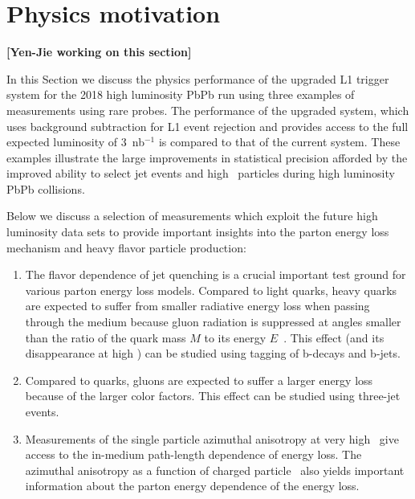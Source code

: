 \section{Physics motivation\label{sec:physHI}}
\label{sec:physics}

{\bf [Yen-Jie working on this section]}

In this Section we discuss the physics performance of the upgraded L1 trigger system for the 2018 high luminosity PbPb run
using three examples of measurements using rare probes. 
The performance of the upgraded system, which uses background subtraction for L1 event rejection and provides 
access to the full expected luminosity of 3~nb$^{-1}$ is compared to that of the current system. 
These examples illustrate the large improvements in statistical precision afforded by the  improved 
ability to select jet events and high \pt\ particles during high luminosity PbPb collisions. 



Below we discuss a selection of measurements which exploit the future high luminosity data sets to 
provide important insights into the parton energy loss mechanism and heavy flavor particle production:

\begin{enumerate}
\item The flavor dependence of jet quenching is a crucial important test ground for various parton energy loss models. 
Compared to light quarks, heavy quarks are expected to suffer from smaller radiative energy loss when passing 
through the medium because gluon radiation is suppressed at angles smaller than the ratio of the quark mass $M$ to 
its energy $E$~\cite{Dokshitzer:2001zm}. This effect (and its disappearance at high \pt) can be studied using tagging
of b-decays and b-jets.
\item Compared to quarks, gluons are expected to suffer a larger 
energy loss because of the larger color factors. This effect can be studied using three-jet events.
\item Measurements of the single particle azimuthal anisotropy at very high \pt\ give access to the in-medium path-length 
dependence of energy loss. The azimuthal anisotropy as a function of charged particle \pt\ also yields 
important information about the parton energy dependence of the energy loss.
\end{enumerate}

